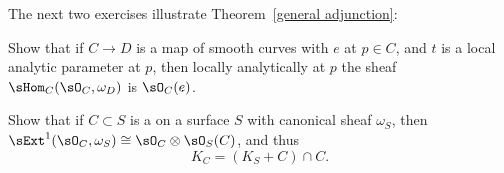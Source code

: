 The next two exercises illustrate Theorem~\ref{general adjunction}:

\begin{exercise}\label{codimension0}
Show that if $C\to D$ is a map of smooth curves with 
%
%
$e$ at $p\in C$, and $t$ is a local
analytic parameter at $p$, then
locally analytically at $p$ the sheaf $\sHom_C(\sO_C, \omega_D)$
is $\sO_C(e)$.
\end{exercise}

\begin{exercise}\label{codimension1}
Show that if $C\subset S$ is a
%
on a surface $S$ with canonical sheaf $\omega_S$,
then $\sExt^1(\sO_C, \omega_S) \cong \sO_C\otimes \sO_S(C)$, and thus
$$K_C = (K_S+C)\cap C.$$
%
\end{exercise}




